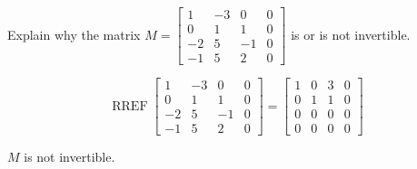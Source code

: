
\begin{exerciseStatement}


Explain why the matrix \(M= \left[\begin{array}{cccc}
1 & -3 & 0 & 0 \\
0 & 1 & 1 & 0 \\
-2 & 5 & -1 & 0 \\
-1 & 5 & 2 & 0
\end{array}\right] \) is or is not invertible.


\end{exerciseStatement}
    
\begin{exerciseAnswer} 


\[\operatorname{RREF} \left[\begin{array}{cccc}
1 & -3 & 0 & 0 \\
0 & 1 & 1 & 0 \\
-2 & 5 & -1 & 0 \\
-1 & 5 & 2 & 0
\end{array}\right] = \left[\begin{array}{cccc}
1 & 0 & 3 & 0 \\
0 & 1 & 1 & 0 \\
0 & 0 & 0 & 0 \\
0 & 0 & 0 & 0
\end{array}\right] \]

\(M\) is not invertible.
\end{exerciseAnswer}
    
